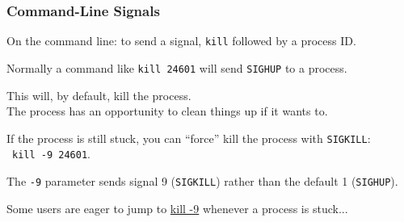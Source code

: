 \begin{frame}
	\frametitle{Command-Line Signals}

	On the command line: to send a signal, \texttt{kill} followed by a process ID.

	Normally a command like \texttt{kill 24601} will send \texttt{SIGHUP} to a process.

	This will, by default, kill the process.\\
	\quad The process has an opportunity to clean things up if it wants to.

	If the process is still stuck, you can ``force'' kill the process with \texttt{SIGKILL}:\\\ \quad \texttt{kill -9 24601}.

	The \texttt{-9} parameter sends signal 9 (\texttt{SIGKILL}) rather than the default 1 (\texttt{SIGHUP}).

	Some users are eager to jump to \href{https://www.youtube.com/watch?v=0rG74rG_ubs&ab_channel=alterlandnet}{kill -9} whenever a process is stuck...
\end{frame}








